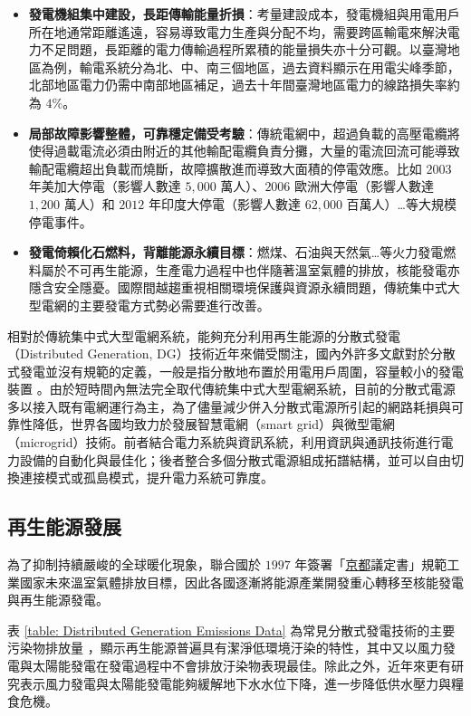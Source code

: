 \begin{itemize}
  \item \textbf{發電機組集中建設，長距傳輸能量折損}：考量建設成本，發電機組與用電用戶所在地通常距離遙遠，容易導致電力生產與分配不均，需要跨區輸電來解決電力不足問題，長距離的電力傳輸過程所累積的能量損失亦十分可觀。以臺灣地區為例，輸電系統分為北、中、南三個地區，過去資料顯示在用電尖峰季節，北部地區電力仍需中南部地區補足，過去十年間臺灣地區電力的線路損失率約為 $4\%$。\cite{boe-data}
  \item \textbf{局部故障影響整體，可靠穩定備受考驗}：傳統電網中，超過負載的高壓電纜將使得過載電流必須由附近的其他輸配電纜負責分攤，大量的電流回流可能導致輸配電纜超出負載而燒斷，故障擴散進而導致大面積的停電效應。比如 $2003$ 年美加大停電（影響人數達 $5,000$ 萬人）、$2006$ 歐洲大停電（影響人數達 $1,200$ 萬人）和 $2012$ 年印度大停電（影響人數達 $62,000$ 百萬人）…等大規模停電事件。
  \item \textbf{發電倚賴化石燃料，背離能源永續目標}：燃煤、石油與天然氣…等火力發電燃料屬於不可再生能源，生產電力過程中也伴隨著溫室氣體的排放，核能發電亦隱含安全隱憂。國際間越趨重視相關環境保護與資源永續問題，傳統集中式大型電網的主要發電方式勢必需要進行改善。
\end{itemize}

相對於傳統集中式大型電網系統，能夠充分利用再生能源的分散式發電（Distributed Generation, DG）技術近年來備受關注，國內外許多文獻對於分散式發電並沒有規範的定義，一般是指分散地布置於用電用戶周圍，容量較小的發電裝置 \cite{nissen2009high}。由於短時間內無法完全取代傳統集中式大型電網系統，目前的分散式電源多以接入既有電網運行為主，為了儘量減少併入分散式電源所引起的網路耗損與可靠性降低，世界各國均致力於發展智慧電網（smart grid）與微型電網（microgrid）技術。前者結合電力系統與資訊系統，利用資訊與通訊技術進行電力設備的自動化與最佳化；後者整合多個分散式電源組成拓譜結構，並可以自由切換連接模式或孤島模式，提升電力系統可靠度。

\subsection{再生能源發展}

為了抑制持續嚴峻的全球暖化現象，聯合國於 $1997$ 年簽署「\uline{京都}議定書」規範工業國家未來溫室氣體排放目標，因此各國逐漸將能源產業開發重心轉移至核能發電與再生能源發電。

表 \ref{table: Distributed Generation Emissions Data} 為常見分散式發電技術的主要污染物排放量 \cite{carter2000emissions}，顯示再生能源普遍具有潔淨低環境汙染的特性，其中又以風力發電與太陽能發電在發電過程中不會排放汙染物表現最佳。除此之外，近年來更有研究表示風力發電與太陽能發電能夠緩解地下水水位下降，進一步降低供水壓力與糧食危機。\cite{He2019}


